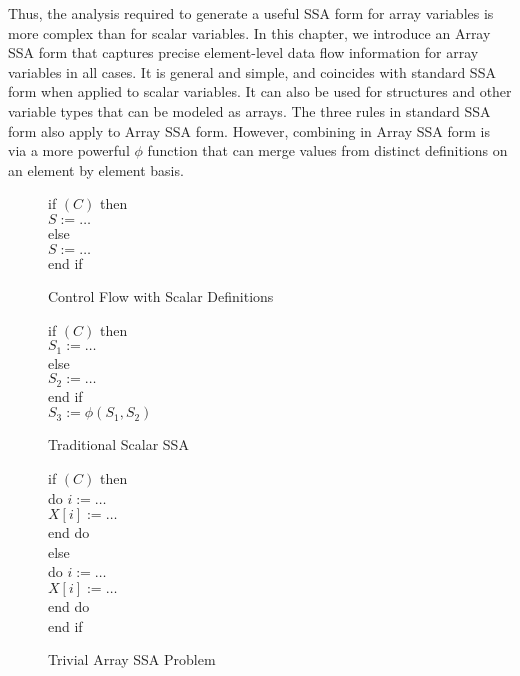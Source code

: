 {Thus,
the analysis required to generate a useful SSA form for array variables
is
more complex than for scalar variables. 
In this chapter,
we introduce an Array SSA form 
that captures precise element-level data flow information for array variables
in all cases. It is general and simple, and
coincides with standard SSA form when applied to scalar variables.  
It can also be used for structures and other variable types
that can be modeled as arrays.
The three rules in standard SSA form also apply to Array SSA form.
However, combining in Array SSA form
is via a more powerful $\phi$ function that can
merge values from distinct definitions on an element by element
basis. 

\begin{figure}
\begin{programa}
\Ta  if $(C)$ then  \\
\Tb  $S := \ldots$   \\
\Ta  else     \\
\Tb  $S := \ldots$  \\
\Ta  end if 
\end{programa}
\caption{Control Flow with Scalar Definitions}
\label{scalar-source}
\end{figure}


\begin{figure}
\begin{programa}
\Ta  if $(C)$ then \\
\Tb   $S_1 := \ldots$ \\
\Ta  else  \\
\Tb   $S_2 := \ldots$ \\
\Ta  end if \\
\Ta  $S_3 := \phi (S_1,S_2)$
\end{programa}
\caption{Traditional Scalar SSA}
\label{trad-ssa}
\end{figure}




\begin{figure}
\begin{programa}
\Ta  if $(C)$ then \\
\Tb  do $i := \ldots$ \\
\Tc    $X[i] := \dots$ \\
\Tb   end do  \\
\Ta  else \\
\Tb   do $i := \ldots$ \\
\Tc    $X[i] := \ldots$ \\
\Tb   end do  \\
\Ta  end if
\end{programa}
\caption{Trivial Array SSA Problem}
\label{triv-array-ssa}
\end{figure}
\begin{figure}


\end{figure}}
